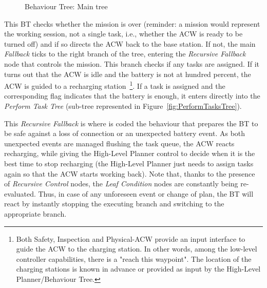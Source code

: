\documentclass[fontsize=11pt, English=false, Español=true, Myfinal=true, twoside, numbers=noenddot]{scrbook}
\begin{document}
{\begin{figure}[ht]
\begin{center}
{\begin{tikzpicture}
		    \end{tikzpicture}}
		\caption{Behaviour Tree: Main tree}
		\label{fig:MainTree}
	\end{center}
	\vspace{-1em}
\end{figure}

This \gls{BT} checks whether the mission is over (reminder: a mission would represent the working session, not a single task, i.e., whether the \gls{ACW} is ready to be turned off) and if so directs the \gls{ACW} back to the base station. If not, the main \emph{Fallback} ticks to the right branch of the tree, entering the \emph{Recursive Fallback} node that controls the mission. This branch checks if any tasks are assigned. If it turns out that the \gls{ACW} is idle and the battery is not at hundred percent, the \gls{ACW} is guided to a recharging station~\footnote{Both Safety, Inspection and Physical-ACW provide an input interface to guide the \gls{ACW} to the charging station. In other words, among the low-level controller capabilities, there is a "reach this waypoint". The location of the charging stations is known in advance or provided as input by the High-Level Planner/Behaviour Tree.}. If a task is assigned and the corresponding flag indicates that the battery is enough, it enters directly into the \emph{Perform Task Tree} (sub-tree represented in Figure~\ref{fig:PerformTasksTree}).

This \emph{Recursive Fallback} is where is coded the behaviour that prepares the \gls{BT} to be safe against a loss of connection or an unexpected battery event. As both unexpected events are managed flushing the task queue, the \gls{ACW} reacts recharging, while giving the High-Level Planner control to decide when it is the best time to stop recharging (the High-Level Planner just needs to assign tasks again so that the \gls{ACW} starts working back). Note that, thanks to the presence of \emph{Recursive Control} nodes, the \emph{Leaf Condition} nodes are constantly being re-evaluated. Thus, in case of any unforeseen event or change of plan, the \gls{BT} will react by instantly stopping the executing branch and switching to the appropriate branch.

\begin{figure}[ht]
	\begin{center}
\end{center}
\end{figure}}
\end{document}
